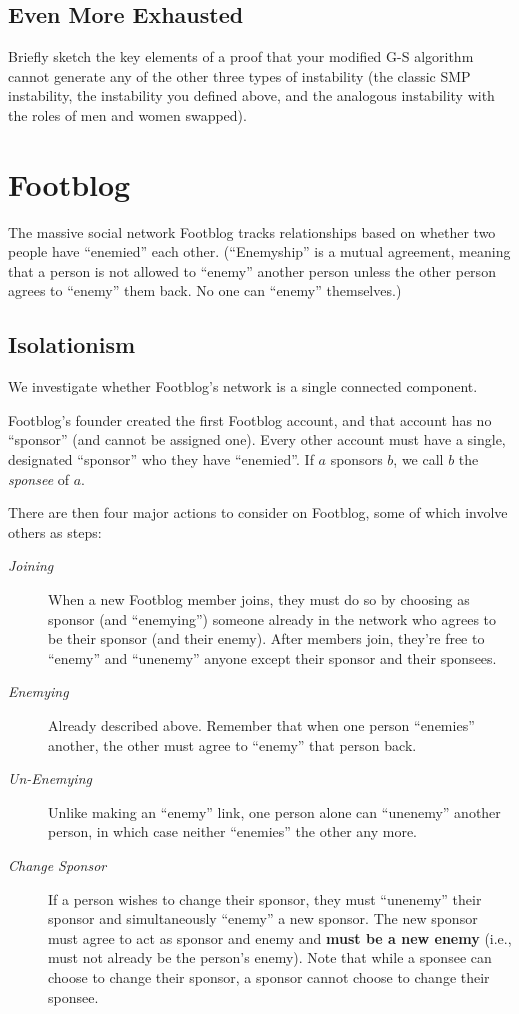 \documentclass[11pt, oneside]{article}   	%
\theoremstyle{definition}
\theoremstyle{remark}
\begin{document}
\subsection{Even More Exhausted}

Briefly sketch the key elements of a proof that your modified G-S
algorithm cannot generate any of the other three types of instability
(the classic SMP instability, the instability you defined above, and
the analogous instability with the roles of men and women swapped).
\section{Footblog}

The massive social network Footblog tracks relationships based on
whether two people have ``enemied'' each other. (``Enemyship'' is a mutual
agreement, meaning that a person is not allowed to ``enemy'' another
person unless the other person agrees to ``enemy'' them back. No one can
``enemy'' themselves.)
\subsection{Isolationism}

We investigate whether Footblog's network is a single connected
component.

Footblog's founder created the first Footblog account, and that
account has no ``sponsor'' (and cannot be assigned one). Every other
account must have a single, designated ``sponsor'' who they have
``enemied''. If $a$ sponsors $b$, we call $b$ the \emph{sponsee} of $a$.

There are then four major actions to consider on Footblog, some of
which involve others as steps:
\begin{description}
\item[\emph{Joining}] When a new Footblog member joins, they must do so by
               choosing as sponsor (and ``enemying'') someone already in
               the network who agrees to be their sponsor (and their
               enemy). After members join, they're free to ``enemy''
               and ``unenemy'' anyone except their sponsor and their
               sponsees.
\item[\emph{Enemying}] Already described above. Remember that when one person
                ``enemies'' another, the other must agree to ``enemy''
                that person back.
\item[\emph{Un-Enemying}] Unlike making an ``enemy'' link, one person alone can
                   ``unenemy'' another person, in which case neither
                   ``enemies'' the other any more.
\item[\emph{Change Sponsor}] If a person wishes to change their sponsor, they
     must ``unenemy'' their sponsor and simultaneously ``enemy'' a new
     sponsor. The new sponsor must agree to act as sponsor and enemy
     and \textbf{must be a new enemy} (i.e., must not already be the person's
     enemy). Note that while a sponsee can choose to change their
     sponsor, a sponsor cannot choose to change their sponsee.
\end{description}
\end{document}
